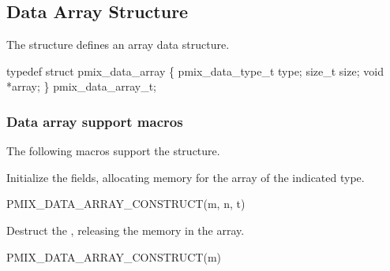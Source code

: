 \subsection{Data Array Structure}

The  structure defines an array data structure.

\cspecificstart
\begin{codepar}
typedef struct pmix_data_array \{
    pmix_data_type_t type;
    size_t size;
    void *array;
\} pmix_data_array_t;
\end{codepar}
\cspecificend

\subsubsection{Data array support macros}
The following macros support the  structure.


Initialize the  fields, allocating memory for the array of the indicated type.

\cspecificstart
\begin{codepar}
PMIX_DATA_ARRAY_CONSTRUCT(m, n, t)
\end{codepar}
\cspecificend

\begin{arglist}
\end{arglist}



Destruct the , releasing the memory in the array.

\cspecificstart
\begin{codepar}
PMIX_DATA_ARRAY_CONSTRUCT(m)
\end{codepar}
\cspecificend

\begin{arglist}
\end{arglist}


